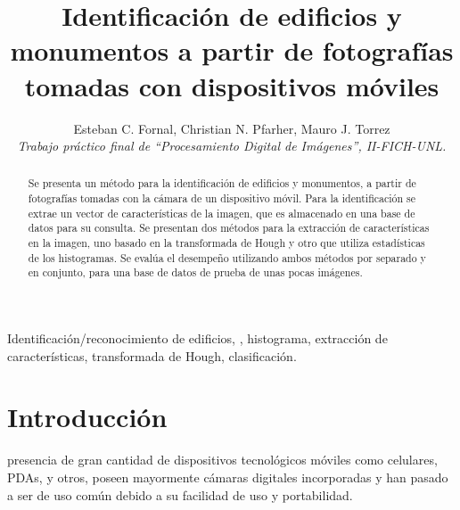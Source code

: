 \documentclass[conference,spanish,a4paper,10pt,oneside,final]{tfmpd}
\begin{document}
\title{Identificación de edificios y monumentos a partir de fotografías
tomadas con dispositivos móviles}
\author{Esteban C. Fornal, Christian N. Pfarher, Mauro J. Torrez\\
\textit{Trabajo práctico final de ``Procesamiento Digital de
Imágenes'', II-FICH-UNL.}}
\maketitle
%
%
%
%
\begin{abstract}
Se presenta un método para la identificación de edificios y monumentos, a
partir de fotografías tomadas con la cámara de un dispositivo móvil.
Para la identificación se extrae un vector de características de la imagen,
que es almacenado en una base de datos para su consulta.
Se presentan dos métodos para la extracción de características en la imagen, uno
basado en la transformada de Hough y otro que utiliza estadísticas de los
histogramas. Se evalúa el desempeño utilizando ambos métodos por separado y en
conjunto, para una base de datos de prueba de unas pocas imágenes.
\end{abstract}
%
%
%
%
\begin{keywords}
Identificación/reconocimiento de edificios, ,
histograma, extracción de características, transformada de Hough, clasificación.
\end{keywords}
%
%
%
%
\section{Introducción}
 presencia de gran cantidad de dispositivos tecnológicos móviles 
como celulares, PDAs, y otros, poseen mayormente cámaras digitales incorporadas
y han pasado a ser de uso común debido a su facilidad de uso y portabilidad.
\end{document}
